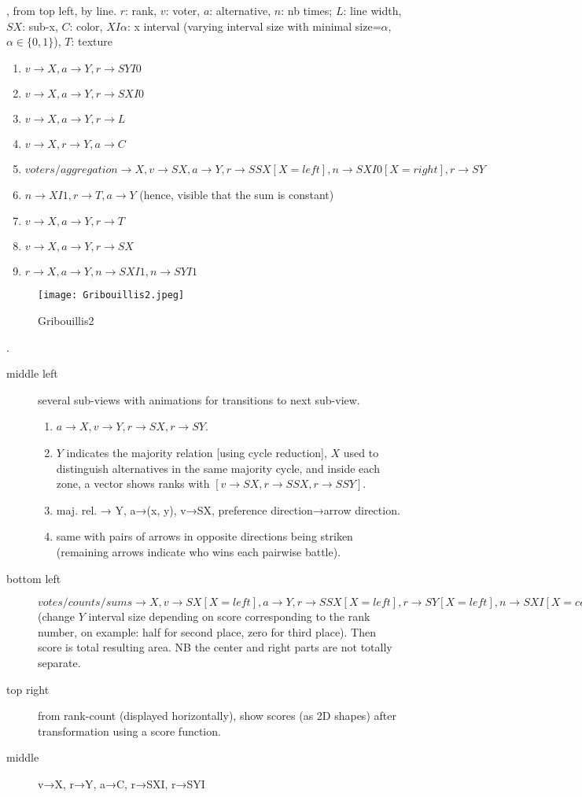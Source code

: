 \documentclass[version=last, pagesize, twoside=off, bibliography=totoc, DIV=calc, fontsize=12pt, a4paper, french, english]{scrartcl}
\begin{document}
, from top left, by line. $r$: rank, $v$: voter, $a$: alternative, $n$: nb times; $L$: line width, $SX$: sub-x, $C$: color, $XI\alpha$: x interval (varying interval size with minimal size=$\alpha$, $\alpha \in \{0, 1\}$), $T$: texture
\begin{enumerate}
	\item $v→X, a→Y, r→SYI0$
	\item $v→X, a→Y, r→SXI0$
	\item $v→X, a→Y, r→L$
	\item $v→X, r→Y, a→C$
	\item $voters / aggregation→X, v→SX, a→Y, r→SSX[X=left], n→SXI0[X=right], r→SY$
	\item $n→XI1, r→T, a→Y$ (hence, visible that the sum is constant)
	\item $v→X, a→Y, r→T$
	\item $v→X, a→Y, r→SX$
	\item $r→X, a→Y, n→SXI1, n→SYI1$
\end{enumerate}

\begin{figure}
	\texttt{[image: Gribouillis2.jpeg]}
	\caption{Gribouillis2}
	\label{fig:g2}
\end{figure}
.
\begin{description}
	\item[middle left] several sub-views with animations for transitions to next sub-view.
	\begin{enumerate}
		\item $a→X, v→Y, r→SX, r→SY$.
		\item $Y$ indicates the majority relation [using cycle reduction], $X$ used to distinguish alternatives in the same majority cycle, and inside each zone, a vector shows ranks with $[v→SX, r→SSX, r→SSY]$. 
		\item maj. rel. → Y, a→(x, y), v→SX, preference direction→arrow direction. 
		\item same with pairs of arrows in opposite directions being striken (remaining arrows indicate who wins each pairwise battle).
	\end{enumerate}
	\item[bottom left] $votes/counts/sums→X, v→SX[X=left], a→Y, r→SSX[X=left], r→SY[X=left], n→SXI[X=center], r→SY[X=center], n→SXI[X=right], r→SYI[X=right]$ (change $Y$ interval size depending on score corresponding to the rank number, on example: half for second place, zero for third place). Then score is total resulting area. NB the center and right parts are not totally separate.
	\item[top right] from rank-count (displayed horizontally), show scores (as 2D shapes) after transformation using a score function.
	\item[middle] v→X, r→Y, a→C, r→SXI, r→SYI
\end{description}
\end{document}
